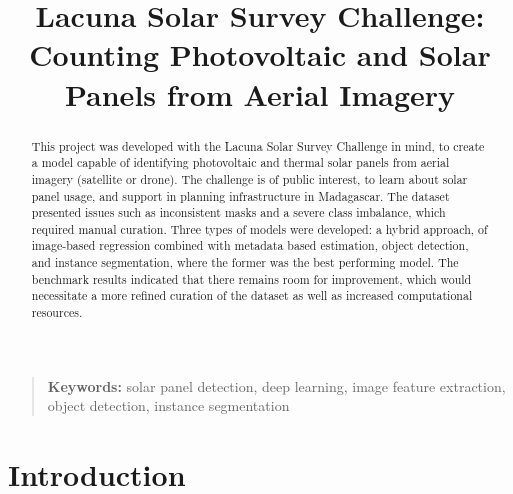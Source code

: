 \documentclass[conference]{IEEEtran}
\begin{document}
\title{Lacuna Solar Survey Challenge: Counting Photovoltaic and Solar Panels from Aerial Imagery}

\author{
\and
{}
}

\maketitle
\thispagestyle{plain}

\begin{abstract}
This project was developed with the Lacuna Solar Survey Challenge in mind, to create a model capable of identifying photovoltaic and thermal solar panels from aerial imagery (satellite or drone). The challenge is of public interest, to learn about solar panel usage, and support in planning infrastructure in Madagascar. The dataset presented issues such as inconsistent masks and a severe class imbalance, which required manual curation. Three types of models were developed: a hybrid approach, of image-based regression combined with metadata based estimation, object detection, and instance segmentation, where the former was the best performing model. The benchmark results indicated that there remains room for improvement, which would necessitate a more refined curation of the dataset as well as increased computational resources.
\end{abstract}

\begin{quote}
\small
\noindent
\textbf{Keywords:} solar panel detection, deep learning, image feature extraction, object detection, instance segmentation
\end{quote}

\IEEEpeerreviewmaketitle


\section{Introduction}
\end{document}
